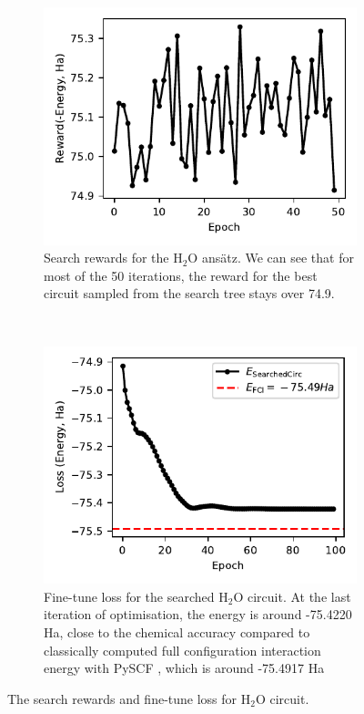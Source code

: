 \documentclass{ieeeaccess}
\begin{document}
  \begin{figure}[ht!]
    \centering
    \begin{subfigure}[t]{0.4\linewidth}
        \includegraphics[width=\linewidth]{peiyong_fig_13.pdf}
        \caption{Search rewards for the $\text{H}_2\text{O}$ ans\"atz. We can see that for most of the 50 iterations, the reward for the best circuit sampled from the search tree stays over 74.9.}
        \label{fig:h2o_search}
    \end{subfigure}
    ~ %
    \begin{subfigure}[t]{0.4\linewidth}
        \includegraphics[width=\linewidth]{peiyong_fig_14.pdf}
        \caption{Fine-tune loss for the searched $\text{H}_2\text{O}$ circuit. At the last iteration of optimisation, the energy is around -75.4220  Ha,  close to the chemical accuracy compared to classically computed full configuration interaction energy with PySCF \cite{Sun2018-nq, Sun2020-ej}, which is around -75.4917  Ha}
        \label{fig:h2o_finetune}
    \end{subfigure}
    \caption{The search rewards and fine-tune loss for $\text{H}_2\text{O}$ circuit.}\label{fig:h2o_search_finetune}
\end{figure}
\end{document}
